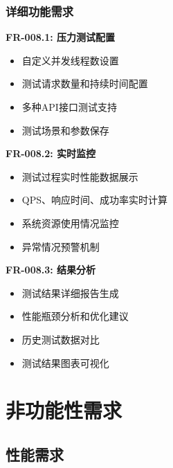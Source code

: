 \documentclass[12pt,a4paper]{article}
\begin{document}
\subsubsection{详细功能需求}

\textbf{FR-008.1: 压力测试配置}
\begin{itemize}
    \item 自定义并发线程数设置
    \item 测试请求数量和持续时间配置
    \item 多种API接口测试支持
    \item 测试场景和参数保存
\end{itemize}

\textbf{FR-008.2: 实时监控}
\begin{itemize}
    \item 测试过程实时性能数据展示
    \item QPS、响应时间、成功率实时计算
    \item 系统资源使用情况监控
    \item 异常情况预警机制
\end{itemize}

\textbf{FR-008.3: 结果分析}
\begin{itemize}
    \item 测试结果详细报告生成
    \item 性能瓶颈分析和优化建议
    \item 历史测试数据对比
    \item 测试结果图表可视化
\end{itemize}

\section{非功能性需求}

\subsection{性能需求}
\end{document}

